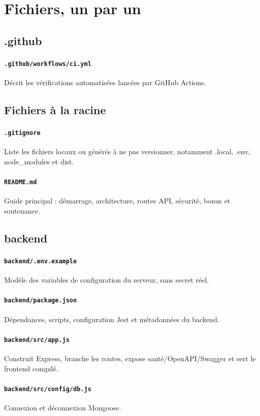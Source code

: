 \documentclass[10pt,a4paper]{article}
\begin{document}
\section*{Fichiers, un par un}
\subsection*{.github}
\paragraph{\texttt{.github/workflows/ci.yml}} Décrit les vérifications automatisées lancées par GitHub Actions.
\subsection*{Fichiers à la racine}
\paragraph{\texttt{.gitignore}} Liste les fichiers locaux ou générés à ne pas versionner, notamment .local, .env, node\_modules et dist.
\paragraph{\texttt{README.md}} Guide principal : démarrage, architecture, routes API, sécurité, bonus et soutenance.
\subsection*{backend}
\paragraph{\texttt{backend/.env.example}} Modèle des variables de configuration du serveur, sans secret réel.
\paragraph{\texttt{backend/package.json}} Dépendances, scripts, configuration Jest et métadonnées du backend.
\paragraph{\texttt{backend/src/app.js}} Construit Express, branche les routes, expose santé/OpenAPI/Swagger et sert le frontend compilé.
\paragraph{\texttt{backend/src/config/db.js}} Connexion et déconnexion Mongoose.
\end{document}
